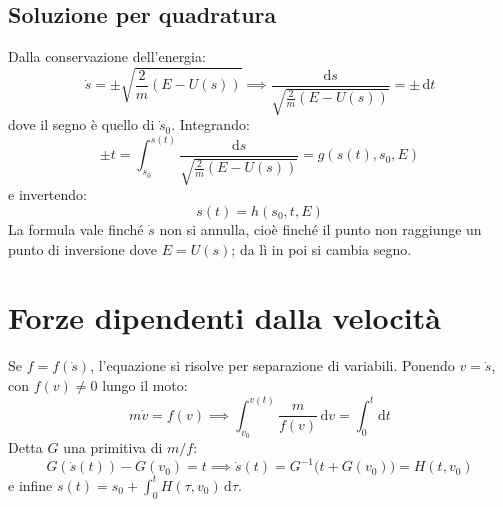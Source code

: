 \documentclass[11pt, a4paper, openright]{book}
\theoremstyle{plain}
\theoremstyle{definition}
\theoremstyle{remark}
\begin{document}
\subsection{Soluzione per quadratura}
Dalla conservazione dell'energia:
\begin{equation}
    \dot{s} = \pm \sqrt{\frac{2}{m}(E - U(s))} \implies \frac{\mathrm{d}s}{\sqrt{\frac{2}{m}(E - U(s))}} = \pm\, \mathrm{d}t
\end{equation}
dove il segno è quello di $\dot{s}_0$. Integrando:
\begin{equation}
    \pm t = \int_{s_0}^{s(t)} \frac{\mathrm{d}s}{\sqrt{\frac{2}{m}(E - U(s))}} = g(s(t), s_0, E)
\end{equation}
e invertendo:
\begin{equation}
    s(t) = h(s_0, t, E)
\end{equation}
La formula vale finché $\dot{s}$ non si annulla, cioè finché il punto non raggiunge un punto di inversione dove $E = U(s)$; da lì in poi si cambia segno.

\section{Forze dipendenti dalla velocità}
Se $f = f(\dot{s})$, l'equazione si risolve per separazione di variabili. Ponendo $v = \dot{s}$, con $f(v) \neq 0$ lungo il moto:
\begin{equation}
    m\dot{v} = f(v) \implies \int_{v_0}^{v(t)} \frac{m}{f(v)}\, \mathrm{d}v = \int_{0}^{t} \mathrm{d}t
\end{equation}
Detta $G$ una primitiva di $m/f$:
\begin{equation}
    G(\dot{s}(t)) - G(v_0) = t \implies \dot{s}(t) = G^{-1}\big(t + G(v_0)\big) = H(t, v_0)
\end{equation}
e infine $s(t) = s_0 + \int_0^t H(\tau, v_0)\, \mathrm{d}\tau$.
\end{document}
